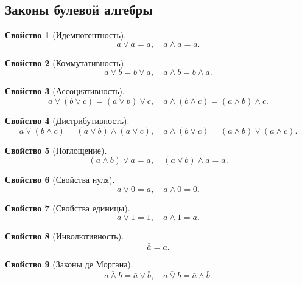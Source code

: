 \documentclass[a5paper, 11pt]{extarticle}
\theoremstyle{definition}
\newtheorem{property}{Свойство}[subsection]
\theoremstyle{definition}
\theoremstyle{definition}
\numberwithin{figure}{section}
\numberwithin{table}{section}
\begin{document}
\subsection{Законы булевой алгебры}

\begin{property}[Идемпотентность]
    \[
        a \lor a = a,
        \quad
        a \land a = a.
    \]
\end{property}

\begin{property}[Коммутативность]
    \[
        a \lor b = b \lor a,
        \quad
        a \land b = b \land a.
    \]
\end{property}

\begin{property}[Ассоциативность]
    \[
        a \lor (b \lor c) = (a \lor b) \lor c,
        \quad
        a \land (b \land c) = (a \land b) \land c.
    \]
\end{property}

\begin{property}[Дистрибутивность]
    \[
        a \lor (b \land c) = (a \lor b) \land (a \lor c),
        \quad
        a \land (b \lor c) = (a \land b) \lor (a \land c).
    \]
\end{property}

\begin{property}[Поглощение]
    \[
        (a \land b) \lor a = a,
        \quad
        (a \lor b) \land a = a.
    \]
\end{property}

\begin{property}[Свойства нуля]
    \[
        a \lor 0 = a,
        \quad
        a \land 0 = 0.
    \]
\end{property}

\begin{property}[Свойства единицы]
    \[
        a \lor 1 = 1,
        \quad
        a \land 1 = a.
    \]
\end{property}

\begin{property}[Инволютивность]
    \[
        \bar{\bar{a}} = a.
    \]
\end{property}

\begin{property}[Законы де Моргана]
    \[
        \overline{a \land b} = \bar{a} \lor \bar{b},
        \quad
        \overline{a \lor b} = \bar{a} \land \bar{b}.
    \]
\end{property}
\end{document}
